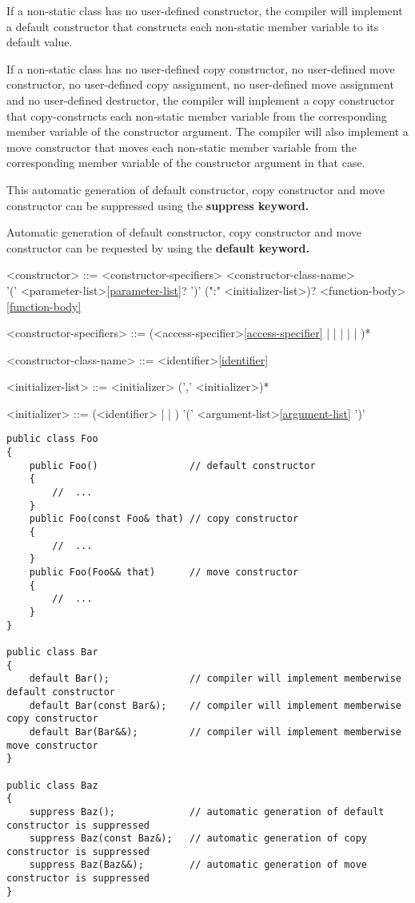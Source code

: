 \documentclass[a4paper,oneside,11pt]{article}
\begin{document}
If a non-static class has no user-defined constructor, the compiler will implement a default constructor that constructs
each non-static member variable to its default value.

If a non-static class has no user-defined copy constructor,
no user-defined move constructor, no user-defined copy assignment, no user-defined move assignment and no user-defined destructor,
the compiler will implement a copy constructor that
copy-constructs each non-static member variable from the corresponding member variable of the constructor argument.
The compiler will also implement a move constructor that moves each non-static member variable from the corresponding
member variable of the constructor argument in that case.

This automatic generation of default constructor, copy constructor and move constructor can be suppressed using the \bf{suppress} keyword.

Automatic generation of default constructor, copy constructor and move constructor can be requested by using the \bf{default} keyword.

\begin{grammar}
\label{constructor}<constructor> ::= <constructor-specifiers> <constructor-class-name>\\
'(' <parameter-list>\ref{parameter-list}? ')' (":" <initializer-list>)? <function-body>\ref{function-body}

<constructor-specifiers> ::= (<access-specifier>\ref{access-specifier} |  |  |  |  | )*

<constructor-class-name> ::= <identifier>\ref{identifier}

<initializer-list> ::= <initializer> (',' <initializer>)*

<initializer>  ::= (<identifier> |  | ) '(' <argument-list>\ref{argument-list} ')'
\end{grammar}

\begin{lstlisting}[frame=trBL]
public class Foo
{
    public Foo()                // default constructor
    {
        //  ...
    }
    public Foo(const Foo& that) // copy constructor
    {
        //  ...
    }
    public Foo(Foo&& that)      // move constructor
    {
        //  ...
    }
}

public class Bar
{
    default Bar();              // compiler will implement memberwise default constructor
    default Bar(const Bar&);    // compiler will implement memberwise copy constructor
    default Bar(Bar&&);         // compiler will implement memberwise move constructor
}

public class Baz
{
    suppress Baz();             // automatic generation of default constructor is suppressed
    suppress Baz(const Baz&);   // automatic generation of copy constructor is suppressed
    suppress Baz(Baz&&);        // automatic generation of move constructor is suppressed
}
\end{lstlisting}
\end{document}
